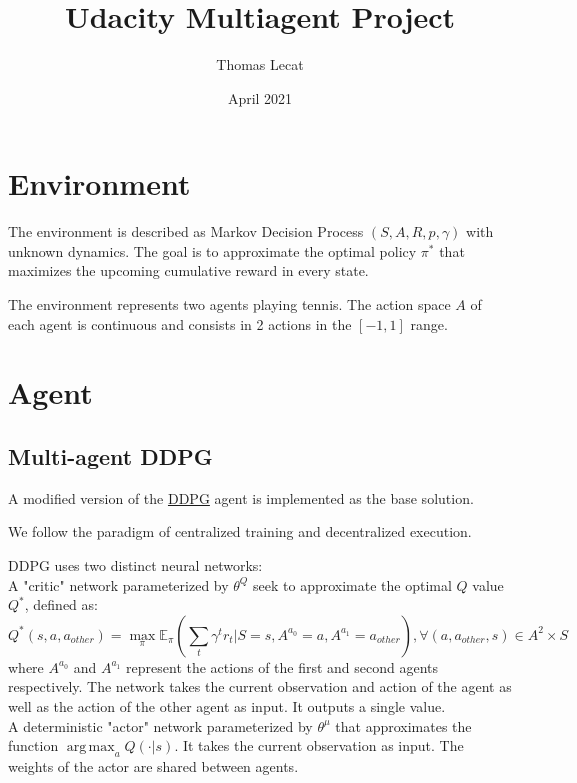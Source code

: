 \documentclass{article}
\title{Udacity Multiagent Project}
\author{Thomas Lecat}
\date{April 2021}
\DeclareMathOperator*{\argmax}{arg\,max}
\begin{document}
    \maketitle


    \section{Environment}\label{sec:environment}

    The environment is described as Markov Decision Process $(S, A, R, p, \gamma)$ with unknown dynamics.
    The goal is to approximate the optimal policy $\pi^*$ that maximizes the upcoming cumulative reward in every state.

    The environment represents two agents playing tennis.
    The action space $A$ of each agent is continuous and consists in 2 actions in the $[-1, 1]$ range.


    \section{Agent}\label{sec:agent}

    \subsection{Multi-agent DDPG}\label{subsec:ddpg}


    A modified version of the \href{https://arxiv.org/abs/1509.02971}{DDPG} agent is implemented as the base solution.

    We follow the paradigm of centralized training and decentralized execution.

    DDPG uses two distinct neural networks: \\

    A "critic" network parameterized by $\theta^Q$ seek to approximate the optimal $Q$ value $Q^*$, defined as:
    \[
        Q^*(s, a, a_{other}) = \max_{\pi} \mathbb{E}_{\pi} (\sum_{t} \gamma^t r_t | S=s, A^{a_0}=a, A^{a_1}=a_{other}),  \forall (a, a_{other}, s) \in A^2 \times S
    \]
    where $A^{a_0}$ and $A^{a_1}$ represent the actions of the first and second agents respectively.
    The network takes the current observation and action of the agent as well as the action of the other agent as input. It outputs a single value.\\

    A deterministic "actor" network parameterized by $\theta^\mu$ that approximates the function $\argmax_a{Q(\cdot|s)}$.
    It takes the current observation as input.
    The weights of the actor are shared between agents.\\
\end{document}

